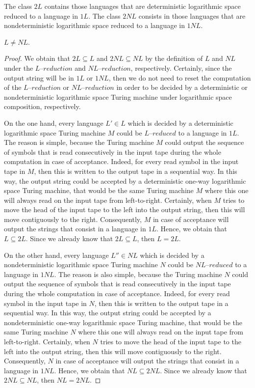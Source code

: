 \documentclass[a4paper,UKenglish,cleveref, autoref]{lipics-v2019}
\begin{document}
\begin{definition}
The class $2L$ contains those languages that are deterministic logarithmic space reduced to a language in $1L$. The class $2NL$ consists in those languages that are nondeterministic logarithmic space reduced to a language in $1NL$.
\end{definition}

\begin{theorem}
\label{negation}
$L \neq NL$.
\end{theorem}

\begin{proof}
We obtain that $2L \subseteq L$ and $2NL \subseteq NL$ by the definition of $L$ and $NL$ under the $\textit{L--reduction}$ and $\textit{NL--reduction}$, respectively. Certainly, since the output string will be in $1L$ or $1NL$, then we do not need to reset the computation of the $\textit{L--reduction}$ or $\textit{NL--reduction}$ in order to be decided by a deterministic or nondeterministic logarithmic space Turing machine under logarithmic space composition, respectively.

On the one hand, every language $L' \in L$ which is decided by a deterministic logarithmic space Turing machine $M$ could be $\textit{L--reduced}$ to a language in $1L$. The reason is simple, because the Turing machine $M$ could output the sequence of symbols that is read consecutively in the input tape during the whole computation in case of acceptance. Indeed, for every read symbol in the input tape in $M$, then this is written to the output tape in a sequential way. In this way, the output string could be accepted by a deterministic one-way logarithmic space Turing machine, that would be the same Turing machine $M$ where this one will always read on the input tape from left-to-right. Certainly, when $M$ tries to move the head of the input tape to the left into the output string, then this will move contiguously to the right. Consequently, $M$ in case of acceptance will output the strings that consist in a language in $1L$. Hence, we obtain that $L \subseteq 2L$. Since we already know that $2L \subseteq L$, then $L = 2L$.

On the other hand, every language $L'' \in NL$ which is decided by a nondeterministic logarithmic space Turing machine $N$ could be $\textit{NL--reduced}$ to a language in $1NL$. The reason is also simple, because the Turing machine $N$ could output the sequence of symbols that is read consecutively in the input tape during the whole computation in case of acceptance. Indeed, for every read symbol in the input tape in $N$, then this is written to the output tape in a sequential way. In this way, the output string could be accepted by a nondeterministic one-way logarithmic space Turing machine, that would be the same Turing machine $N$ where this one will always read on the input tape from left-to-right. Certainly, when $N$ tries to move the head of the input tape to the left into the output string, then this will move contiguously to the right. Consequently, $N$ in case of acceptance will output the strings that consist in a language in $1NL$. Hence, we obtain that $NL \subseteq 2NL$. Since we already know that $2NL \subseteq NL$, then $NL = 2NL$.


\end{proof}
\end{document}
